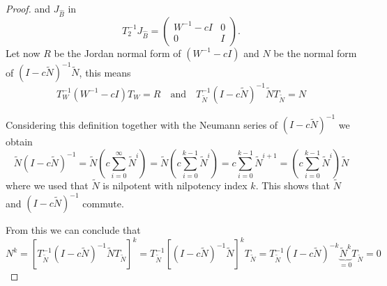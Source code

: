 \begin{proof}
	and $J_{\hat{B}}$ in
	\begin{displaymath}
		T_2^{-1}J_{\hat{B}} =
		\left(
		\begin{matrix}
			W^{-1}-cI & 0 \\
			0 & I
		\end{matrix}
		\right) .
	\end{displaymath}
	Let now $R$ be the Jordan normal form of $(W^{-1}-cI)$ and $N$ be the normal form of $(I-c\tilde{N})^{-1}\tilde{N}$, this means
	\begin{displaymath}
		T_W^{-1}(W^{-1}-cI)T_W = R \quad \text{and} \quad T_{\tilde{N}}^{-1}(I-c\tilde{N})^{-1}\tilde{N}T_{\tilde{N}} = N
	\end{displaymath}

	Considering this definition together with the Neumann series of $(I-c\tilde{N})^{-1}$ we obtain
	\begin{displaymath}
		\tilde{N} (I-c\tilde{N})^{-1} = \tilde{N} (c \sum_{i=0}^{\infty} \tilde{N}^i) = \tilde{N} (c \sum_{i=0}^{k-1} \tilde{N}^i) = c \sum_{i=0}^{k-1} \tilde{N}^{i+1} = (c \sum_{i=0}^{k-1} \tilde{N}^{i}) \tilde{N}
	\end{displaymath}
	where we used that $\tilde{N}$ is nilpotent with nilpotency index $k$. This shows that $\tilde{N}$ and $(I-c\tilde{N})^{-1}$ commute.
	
	From this we can conclude that
	\begin{displaymath}
		N^k = [T_{\tilde{N}}^{-1}(I-c\tilde{N})^{-1}\tilde{N}T_{\tilde{N}}]^k = T_{\tilde{N}}^{-1}[(I-c\tilde{N})^{-1}\tilde{N}]^kT_{\tilde{N}} = T_{\tilde{N}}^{-1}(I-c\tilde{N})^{-k}\underbrace{\tilde{N}^k}_{=0}T_{\tilde{N}} = 0
	\end{displaymath}
	

\end{proof}
